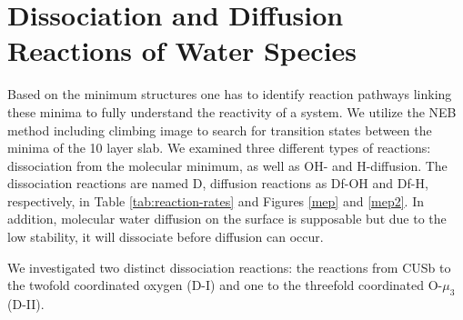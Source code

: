 \documentclass[11pt,DIV=13,BCOR=5mm,a4paper,headinclude]{scrbook}
\begin{document}
\section{Dissociation and Diffusion Reactions of Water Species}\label{reactions}

Based on the minimum structures one has to identify reaction pathways linking these minima to fully understand the reactivity of a system.
We utilize the NEB method including climbing image to search for transition states between the minima of the 10 layer slab.
We examined three different types of reactions: dissociation from the molecular minimum, as well as OH- and H-diffusion.
The dissociation reactions are named D, diffusion reactions as Df-OH and Df-H, respectively, in Table \ref{tab:reaction-rates} and Figures \ref{mep} and \ref{mep2}.
In addition, molecular water diffusion on the surface is supposable but due to the low stability, it will dissociate before diffusion can occur.


We investigated two distinct dissociation reactions: the reactions from CUSb to the twofold coordinated oxygen (D-I) and one to the threefold coordinated O-$\mu_3$ (D-II).
\end{document}
